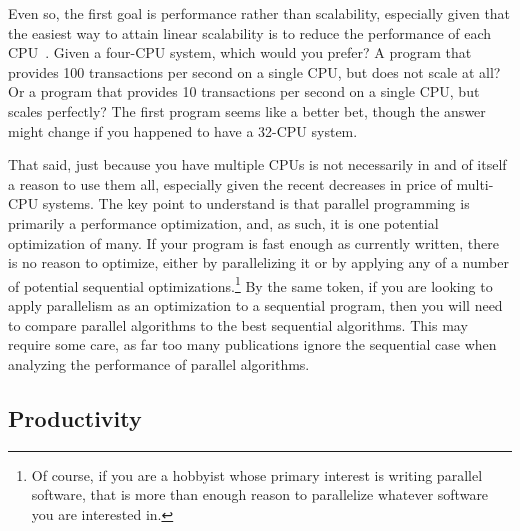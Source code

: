\QuickQuizEnd

Even so, the first goal is performance rather than scalability,
especially given that the easiest way to attain linear scalability
is to reduce the performance of each CPU~\cite{LinusTorvalds2001a}.
Given a four-CPU system, which would you prefer?
A program that provides 100 transactions per second on a single CPU,
but does not scale at all?
Or a program that provides 10 transactions per second on a single CPU,
but scales perfectly?
The first program seems like a better bet, though the answer might
change if you happened to have a 32-CPU system.

That said, just because you have multiple CPUs is not necessarily
in and of itself a reason to use them all, especially given the
recent decreases in price of multi-CPU systems.
The key point to understand is that parallel programming is primarily
a performance optimization, and, as such, it is one potential optimization
of many.
If your program is fast enough as currently written, there is no
reason to optimize, either by parallelizing it or by applying any
of a number of potential sequential optimizations.\footnote{
	Of course, if you are a hobbyist whose primary interest is
	writing parallel software, that is more than enough reason to
	parallelize whatever software you are interested in.}
By the same token, if you are looking to apply parallelism as an
optimization to a sequential program, then you will need to compare
parallel algorithms to the best sequential algorithms.
This may require some care, as far too many publications ignore the
sequential case when analyzing the performance of parallel algorithms.

\subsection{Productivity}
\label{sec:intro:Productivity}

\QuickQuizEnd

